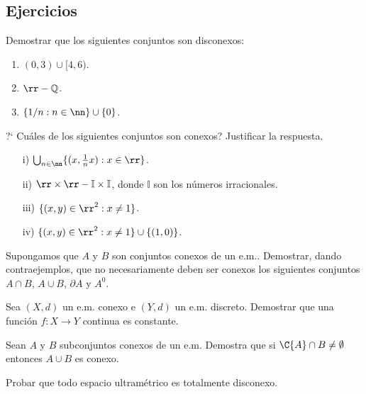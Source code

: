 \subsection{Ejercicios}

\begin{ejercicio}{} Demostrar que los siguientes conjuntos son
disconexos:
\begin{enumerate}
    \item $(0,3)\cup [4,6)$.
    \item $\rr-\mathbb{Q}$.
    \item $\{1/n:n\in\nn\}\cup \{0\}$.
\end{enumerate}
\end{ejercicio}

\begin{ejercicio}{} ?` Cu\'ales de los siguientes conjuntos son
conexos? Justificar la respuesta.
\begin{itemize}
    \item[i)] $\bigcup_{n\in\nn}\{(x,\frac1nx):x\in\rr\}$.
    \item[ii)] $\rr\times\rr-\mathbb{I}\times\mathbb{I}$, donde
    $\mathbb{I}$ son los n\'umeros irracionales.
    \item[iii)] $\{(x,y)\in\rr^2:x\neq 1\}$.
    \item[iv)] $\{(x,y)\in\rr^2:x\neq 1\}\cup\{(1,0)\}$.
\end{itemize}
\end{ejercicio}

\begin{ejercicio}{} Supongamos que  $A$ y $B$ son conjuntos conexos
de un e.m.. Demostrar, dando contraejemplos, que no necesariamente
deben ser conexos los siguientes conjuntos $A\cap B$, $A\cup B$,
$\partial A$ y $A^0$.
\end{ejercicio}

\begin{ejercicio}{} Sea $(X,d)$ un e.m. conexo e $(Y,d)$ un e.m. discreto.
Demostrar que una funci\'on $f:X\to Y$ continua es constante.
\end{ejercicio}

\begin{ejercicio}{} Sean $A$ y $B$ subconjuntos conexos de un e.m.
Demostra que si $\C{A}\cap B\neq\emptyset$ entonces $A\cup B$ es
conexo.
\end{ejercicio}

\begin{ejercicio}{} Probar que todo espacio ultram\'etrico es
totalmente disconexo.
\end{ejercicio}

